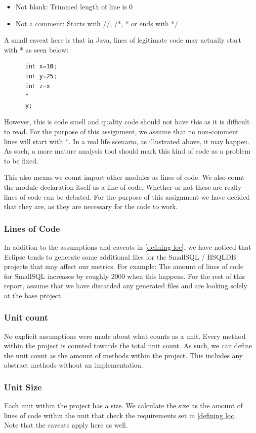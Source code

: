 \documentclass{article}
\begin{document}
\begin{itemize}
\item Not blank: Trimmed length of line is 0
\item Not a comment: Starts with //, /*, * or ends with */
\end{itemize}

A small caveat here is that in Java, lines of legitimate code may actually start with * as seen below:
\begin{lstlisting}
      int x=10;
      int y=25;
      int z=x
      *
      y;
\end{lstlisting}

However, this is code smell and quality code should not have this as it is difficult to read. For the purpose of this assignment, we assume that no non-comment lines will start with *.
In a real life scenario, as illustrated above, it may happen. As such, a more mature analysis tool should mark this kind of code as a problem to be fixed.

This also means we count import other modules as lines of code. We also count the module declaration itself as a line of code. Whether or not these are really lines of code can be debated. For the purpose of this assignment we have decided that they are, as they are necessary for the code to work.

\subsubsection{Lines of Code}
In addition to the assumptions and caveats in \ref{defining loc}, we have noticed that Eclipse tends to generate some additional files for the SmallSQL / HSQLDB projects that may affect our metrics. For example: The amount of lines of code for SmallSQL increases by roughly 2000 when this happens.
For the rest of this report, assume that we have discarded any generated files and are looking solely at the base project.

\subsubsection{Unit count}
No explicit assumptions were made about what counts as a unit. Every method within the project is counted towards the total unit count.
As such, we can define the unit count as the amount of methods within the project. This includes any abstract methods without an implementation.

\subsubsection{Unit Size}
Each unit within the project has a size. We calculate the size as the amount of lines of code within the unit that check the requirements set in \ref{defining loc}. Note that the caveats apply here as well.
\end{document}
